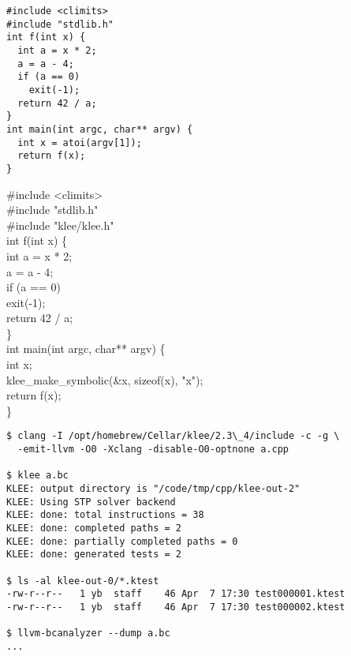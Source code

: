 \documentclass{article}
\begin{document}
\plush{}



\begin{pptWide}{2}
{\scriptsize\begin{verbatim}
#include <climits>
#include "stdlib.h"
int f(int x) {
  int a = x * 2;
  a = a - 4;
  if (a == 0)
    exit(-1);
  return 42 / a;
}
int main(int argc, char** argv) {
  int x = atoi(argv[1]);
  return f(x);
}
\end{verbatim}
}
\par\columnbreak\par
{\ttfamily\scriptsize
\#include <climits> \\
\#include "stdlib.h" \\
{\color{red}\#include "klee/klee.h"} \\
int f(int x) \{ \\
\quad  int a = x * 2; \\
\quad  a = a - 4; \\
\quad  if (a == 0) \\
\quad\quad    exit(-1); \\
\quad  return 42 / a; \\
\} \\
int main(int argc, char** argv) \{ \\
{\color{red}
\quad  int x; \\
\quad  klee\_make\_symbolic(\&x, sizeof(x), "x");} \\
\quad  return f(x); \\
\}}
\end{pptWide}

\plush{}


{\scriptsize\begin{verbatim}
$ clang -I /opt/homebrew/Cellar/klee/2.3\_4/include -c -g \
  -emit-llvm -O0 -Xclang -disable-O0-optnone a.cpp

$ klee a.bc
KLEE: output directory is "/code/tmp/cpp/klee-out-2"
KLEE: Using STP solver backend
KLEE: done: total instructions = 38
KLEE: done: completed paths = 2
KLEE: done: partially completed paths = 0
KLEE: done: generated tests = 2

$ ls -al klee-out-0/*.ktest
-rw-r--r--   1 yb  staff    46 Apr  7 17:30 test000001.ktest
-rw-r--r--   1 yb  staff    46 Apr  7 17:30 test000002.ktest

$ llvm-bcanalyzer --dump a.bc
...
\end{verbatim}
}
\end{document}
